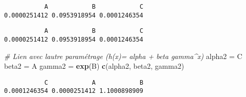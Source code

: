 \documentclass[
]{article}
\newenvironment{Shaded}{\begin{snugshade}}{\end{snugshade}}
\newcommand{\CommentTok}[1]{\textcolor[rgb]{0.56,0.35,0.01}{\textit{#1}}}
\newcommand{\FunctionTok}[1]{\textcolor[rgb]{0.13,0.29,0.53}{\textbf{#1}}}
\newcommand{\NormalTok}[1]{#1}
\newcommand{\OtherTok}[1]{\textcolor[rgb]{0.56,0.35,0.01}{#1}}
\newcommand{\SpecialCharTok}[1]{\textcolor[rgb]{0.81,0.36,0.00}{\textbf{#1}}}
\newcommand{\StringTok}[1]{\textcolor[rgb]{0.31,0.60,0.02}{#1}}
\begin{document}
\begin{verbatim}
           A            B            C 
0.0000251412 0.0953918954 0.0001246354 
\end{verbatim}

\begin{Shaded}
\end{Shaded}

\begin{verbatim}
           A            B            C 
0.0000251412 0.0953918954 0.0001246354 
\end{verbatim}

\begin{Shaded}
\begin{Highlighting}[]
\CommentTok{\# Lien avec l\textquotesingle{}autre paramétrage (h(x)= alpha + beta gamma\^{}x)}
\NormalTok{alpha2 }\OtherTok{=}\NormalTok{ C}
\NormalTok{beta2 }\OtherTok{=}\NormalTok{ A}
\NormalTok{gamma2 }\OtherTok{=} \FunctionTok{exp}\NormalTok{(B)}
\FunctionTok{c}\NormalTok{(alpha2, beta2, gamma2)}
\end{Highlighting}
\end{Shaded}

\begin{verbatim}
           C            A            B 
0.0001246354 0.0000251412 1.1000898909 
\end{verbatim}
\end{document}
